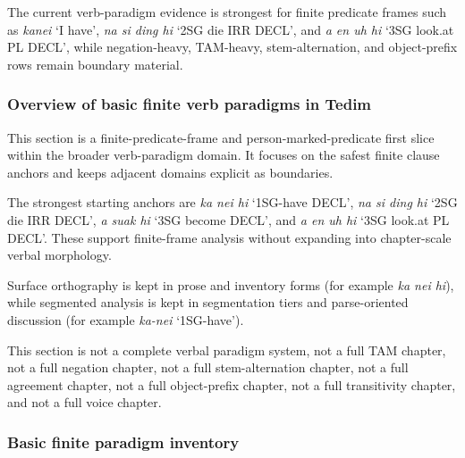 \documentclass[
  11pt,
  a4paper,
]{article}
\newcommand{\tdim}[1]{\textit{#1}}
\newcommand{\glossquote}[1]{`#1'}
\begin{document}
The current verb-paradigm evidence is strongest for finite predicate
frames such as \tdim{kanei} \glossquote{I have}, \tdim{na si ding hi}
\glossquote{2SG die IRR DECL}, and \tdim{a en uh hi}
\glossquote{3SG look.at PL DECL}, while negation-heavy, TAM-heavy,
stem-alternation, and object-prefix rows remain boundary material.

\subsubsection{Overview of basic finite verb paradigms in
Tedim}\label{overview-of-basic-finite-verb-paradigms-in-tedim}

This section is a finite-predicate-frame and person-marked-predicate
first slice within the broader verb-paradigm domain. It focuses on the
safest finite clause anchors and keeps adjacent domains explicit as
boundaries.

The strongest starting anchors are \tdim{ka nei hi}
\glossquote{1SG-have DECL}, \tdim{na si ding hi}
\glossquote{2SG die IRR DECL}, \tdim{a suak hi}
\glossquote{3SG become DECL}, and \tdim{a en uh hi}
\glossquote{3SG look.at PL DECL}. These support finite-frame analysis
without expanding into chapter-scale verbal morphology.

Surface orthography is kept in prose and inventory forms (for example
\tdim{ka nei hi}), while segmented analysis is kept in segmentation
tiers and parse-oriented discussion (for example \tdim{ka-nei}
\glossquote{1SG-have}).

This section is not a complete verbal paradigm system, not a full TAM
chapter, not a full negation chapter, not a full stem-alternation
chapter, not a full agreement chapter, not a full object-prefix chapter,
not a full transitivity chapter, and not a full voice chapter.

\subsubsection{Basic finite paradigm
inventory}\label{basic-finite-paradigm-inventory}
\end{document}
